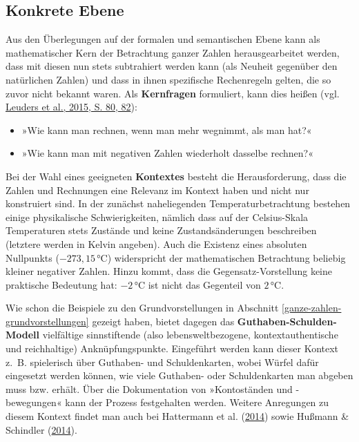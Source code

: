 \documentclass[
]{scrbook}
\providecommand{\tightlist}{%
  \setlength{\itemsep}{0pt}\setlength{\parskip}{0pt}}
\theoremstyle{definition}
\theoremstyle{definition}
\theoremstyle{definition}
\theoremstyle{definition}
\theoremstyle{remark}
\begin{document}
\hypertarget{ganze-zahlen-konkrete-ebene}{%
\subsection{Konkrete Ebene}\label{ganze-zahlen-konkrete-ebene}}

Aus den Überlegungen auf der formalen und semantischen Ebene kann als mathematischer Kern der Betrachtung ganzer Zahlen herausgearbeitet werden, dass mit diesen nun stets subtrahiert werden kann (als Neuheit gegenüber den natürlichen Zahlen) und dass in ihnen spezifische Rechenregeln gelten, die so zuvor nicht bekannt waren. Als \textbf{Kernfragen} formuliert, kann dies heißen (vgl. \protect\hyperlink{ref-Barzel2015a}{Leuders et al., 2015, S. 80, 82}):

\begin{itemize}
\tightlist
\item
  »Wie kann man rechnen, wenn man mehr wegnimmt, als man hat?«
\item
  »Wie kann man mit negativen Zahlen wiederholt dasselbe rechnen?«
\end{itemize}

Bei der Wahl eines geeigneten \textbf{Kontextes} besteht die Herausforderung, dass die Zahlen und Rechnungen eine Relevanz im Kontext haben und nicht nur konstruiert sind. In der zunächst naheliegenden Temperaturbetrachtung bestehen einige physikalische Schwierigkeiten, nämlich dass auf der Celsius-Skala Temperaturen stets Zustände und keine Zustandsänderungen beschreiben (letztere werden in Kelvin angeben). Auch die Existenz eines absoluten Nullpunkts (\(-273,\!15\,°\mathrm{C}\)) widerspricht der mathematischen Betrachtung beliebig kleiner negativer Zahlen. Hinzu kommt, dass die Gegensatz-Vorstellung keine praktische Bedeutung hat: \(-2\,°\mathrm{C}\) ist nicht das Gegenteil von \(2\,°\mathrm{C}\).

Wie schon die Beispiele zu den Grundvorstellungen in Abschnitt \ref{ganze-zahlen-grundvorstellungen} gezeigt haben, bietet dagegen das \textbf{Guthaben-Schulden-Modell} vielfältige sinnstiftende (also lebensweltbezogene, kontextauthentische und reichhaltige) Anknüpfungspunkte. Eingeführt werden kann dieser Kontext z.~B. spielerisch über Guthaben- und Schuldenkarten, wobei Würfel dafür eingesetzt werden können, wie viele Guthaben- oder Schuldenkarten man abgeben muss bzw. erhält. Über die Dokumentation von »Kontoständen und -bewegungen« kann der Prozess festgehalten werden. Weitere Anregungen zu diesem Kontext findet man auch bei Hattermann et al. (\protect\hyperlink{ref-Hattermann2014}{2014}) sowie Hußmann \& Schindler (\protect\hyperlink{ref-Hussmann2014}{2014}).
\end{document}
